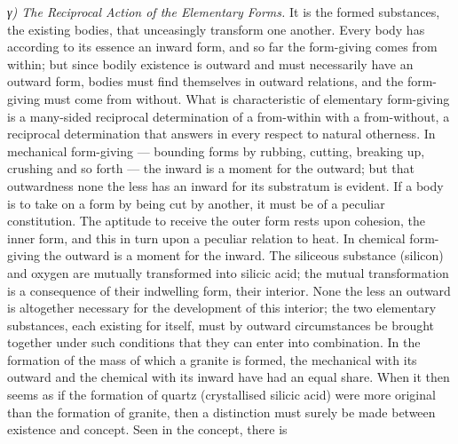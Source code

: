 \documentclass[12pt,a4paper]{book}
\newcommand{\subrunin}[1]{\emph{#1}\hspace{0.4em}}
\begin{document}
\subrunin{γ) The Reciprocal Action of the Elementary Forms.} It is the formed substances, the existing bodies, that
unceasingly transform one another. Every body has according to its essence an inward form, and so far the form-giving
comes from within; but since bodily existence is outward and must necessarily have an outward form, bodies must find
themselves in outward relations, and the form-giving must come from without. What is characteristic of elementary
form-giving is a many-sided reciprocal determination of a from-within with a from-without, a reciprocal determination
that answers in every respect to natural otherness. In mechanical form-giving --- bounding forms by rubbing, cutting,
breaking up, crushing and so forth --- the inward is a moment for the outward; but that outwardness none the less has an
inward for its substratum is evident. If a body is to take on a form by being cut by another, it must be of a peculiar
constitution. The aptitude to receive the outer form rests upon cohesion, the inner form, and this in
turn upon a peculiar relation to heat. In chemical form-giving the
outward is a moment for the inward. The siliceous substance (silicon) and oxygen are mutually transformed into silicic
acid; the mutual transformation is a consequence of their indwelling form, their interior. None the less an outward is
altogether necessary for the development of this interior; the two elementary substances, each existing for itself, must
by outward circumstances be brought together under such conditions that they can enter into combination. In the formation
of the mass of which a granite is formed, the mechanical with its outward and the chemical with its inward have had an
equal share. When it then seems as if the formation of quartz (crystallised silicic acid) were more original than the
formation of granite, then a distinction must surely be made between existence and concept. Seen in the concept, there is
\end{document}
